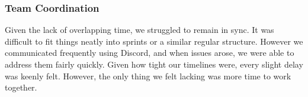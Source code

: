 \subsubsection{Team Coordination}

Given the lack of overlapping time, we struggled to remain in sync. It was difficult to fit things neatly into sprints or a similar regular structure. However we communicated frequently using Discord, and when issues arose, we were able to address them fairly quickly. Given how tight our timelines were, every slight delay was keenly felt. However, the only thing we felt lacking was more time to work together. 